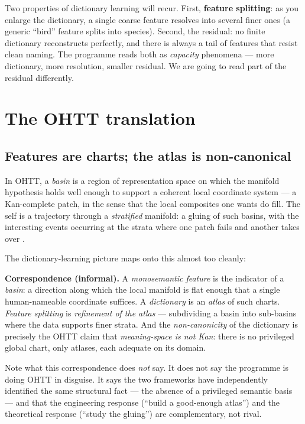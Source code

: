 \documentclass[11pt,a4paper]{article}
\begin{document}
Two properties of dictionary learning will recur. First, \textbf{feature splitting}: as you
enlarge the dictionary, a single coarse feature resolves into several finer ones (a generic
``bird'' feature splits into species). Second, the residual: no finite dictionary reconstructs
perfectly, and there is always a tail of features that resist clean naming. The programme reads
both as \emph{capacity} phenomena --- more dictionary, more resolution, smaller residual. We are
going to read part of the residual differently.

\section{The OHTT translation}

\subsection{Features are charts; the atlas is non-canonical}

In OHTT, a \emph{basin} is a region of representation space on which the manifold hypothesis
holds well enough to support a coherent local coordinate system --- a Kan-complete patch, in the
sense that the local composites one wants do fill. The self is a trajectory through a
\emph{stratified} manifold: a gluing of such basins, with the interesting events occurring at the
strata where one patch fails and another takes over \cite{rr,meson}.

The dictionary-learning picture maps onto this almost too cleanly:

\begin{claimbox}
\textbf{Correspondence (informal).}
A \emph{monosemantic feature} is the indicator of a \emph{basin}: a direction along which the
local manifold is flat enough that a single human-nameable coordinate suffices. A
\emph{dictionary} is an \emph{atlas} of such charts. \emph{Feature splitting} is
\emph{refinement of the atlas} --- subdividing a basin into sub-basins where the data supports
finer strata. And the \emph{non-canonicity} of the dictionary is precisely the OHTT claim that
\emph{meaning-space is not Kan}: there is no privileged global chart, only atlases, each adequate
on its domain.
\end{claimbox}

Note what this correspondence does \emph{not} say. It does not say the programme is doing
OHTT in disguise. It says the two frameworks have independently identified the same structural
fact --- the absence of a privileged semantic basis --- and that the engineering response
(``build a good-enough atlas'') and the theoretical response (``study the gluing'') are
complementary, not rival.
\end{document}
